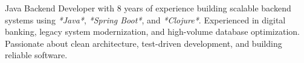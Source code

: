 

\begin{cvparagraph}


Java Backend Developer with 8 years of experience building scalable backend systems using \textit{*Java*}, \textit{*Spring Boot*}, and \textit{*Clojure*}. Experienced in digital banking, legacy system modernization, and high-volume database optimization. Passionate about clean architecture, test-driven development, and building reliable software.

\end{cvparagraph}
